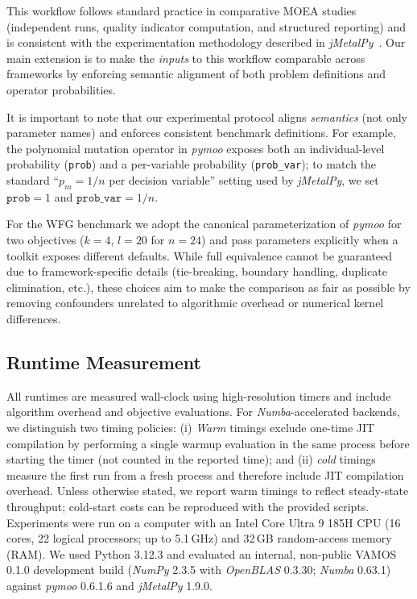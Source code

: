 \documentclass[journal]{IEEEtran}
\newcommand{\VAMOS}{VAMOS}
\begin{document}
This workflow follows standard practice in comparative MOEA studies (independent runs, quality indicator computation, and structured reporting) and is consistent with the experimentation methodology described in \textit{jMetalPy}~\cite{BNG+19}. Our main extension is to make the \emph{inputs} to this workflow comparable across frameworks by enforcing semantic alignment of both problem definitions and operator probabilities. 

It is important to note that our experimental protocol aligns \emph{semantics} (not only parameter names) and enforces consistent benchmark definitions. For example, the polynomial mutation operator in \textit{pymoo} exposes both an individual-level probability (\texttt{prob}) and a per-variable probability (\texttt{prob\_var}); to match the standard ``$p_m=1/n$ per decision variable'' setting used by \textit{jMetalPy}, we set $\texttt{prob}=1$ and $\texttt{prob\_var}=1/n$.

For the WFG benchmark we adopt the canonical parameterization of \textit{pymoo} for two objectives ($k=4$, $l=20$ for $n=24$) and pass parameters explicitly when a toolkit exposes different defaults. While full equivalence cannot be guaranteed due to framework-specific details (tie-breaking, boundary handling, duplicate elimination, etc.), these choices aim to make the comparison as fair as possible by removing confounders unrelated to algorithmic overhead or numerical kernel differences.


\subsection{Runtime Measurement}

All runtimes are measured wall-clock using high-resolution timers and include algorithm overhead and objective evaluations. For \textit{Numba}-accelerated backends, we distinguish two timing policies: (i) \textit{Warm} timings exclude one-time JIT compilation by performing a single warmup evaluation in the same process before starting the timer (not counted in the reported time); and (ii) \textit{cold} timings measure the first run from a fresh process and therefore include JIT compilation overhead. Unless otherwise stated, we report warm timings to reflect steady-state throughput; cold-start costs can be reproduced with the provided scripts. Experiments were run on a computer with an Intel Core Ultra 9 185H CPU (16 cores, 22 logical processors; up to 5.1\,GHz) and 32\,GB random-access memory (RAM). We used Python 3.12.3 and evaluated an internal, non-public \VAMOS{} 0.1.0 development build (\textit{NumPy} 2.3.5 with \textit{OpenBLAS} 0.3.30; \textit{Numba} 0.63.1) against \textit{pymoo} 0.6.1.6 and \textit{jMetalPy} 1.9.0.
\end{document}
